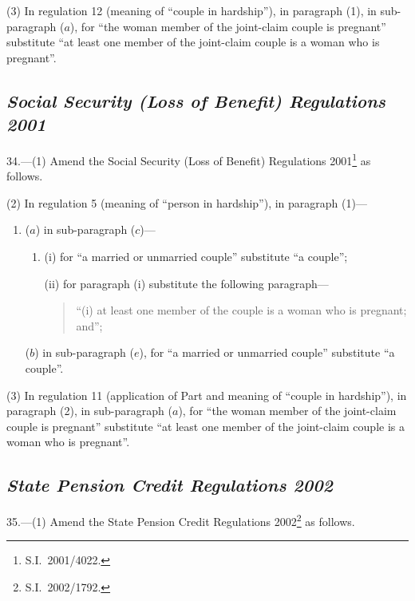 \documentclass[12pt,a4paper]{article}
\begin{document}
(3) In regulation 12 (meaning of “couple in hardship”), in paragraph (1), in sub-paragraph ($a$), for “the woman member of the joint-claim couple is pregnant” substitute “at least one member of the joint-claim couple is a woman who is pregnant”.

\subsection*{\itshape Social Security (Loss of Benefit) Regulations 2001}

34.---(1)  Amend the Social Security (Loss of Benefit) Regulations 2001\footnote{S.I.\ 2001/4022.} as follows.

(2) In regulation 5 (meaning of “person in hardship”), in paragraph (1)—
\begin{enumerate}\item[]
($a$) in sub-paragraph ($c$)—
\begin{enumerate}\item[]
(i) for “a married or unmarried couple” substitute “a couple”;

(ii) for paragraph (i)  substitute the following paragraph—
\begin{quotation}
“(i) at least one member of the couple is a woman who is pregnant; and”;
\end{quotation}
\end{enumerate}

($b$) in sub-paragraph ($e$), for “a married or unmarried couple” substitute “a couple”.
\end{enumerate}

(3) In regulation 11 (application of Part and meaning of “couple in hardship”), in paragraph (2), in sub-paragraph ($a$), for “the woman member of the joint-claim couple is pregnant” substitute “at least one member of the joint-claim couple is a woman who is pregnant”.

\subsection*{\itshape State Pension Credit Regulations 2002}

35.---(1)  Amend the State Pension Credit Regulations 2002\footnote{S.I.\ 2002/1792.} as follows.
\end{document}
